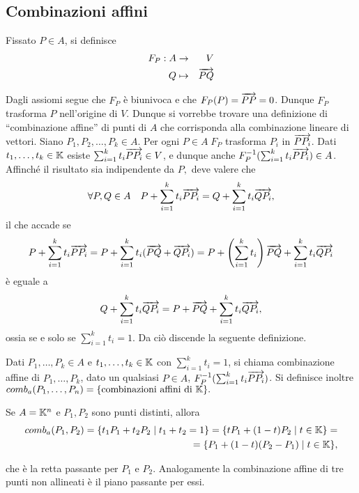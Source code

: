 	\subsection{Combinazioni affini}
 
 Fissato $P\in A$, si definisce
 \begin{eqnarray*}
  F_P: A & \to & V \\
  Q & \mapsto & \overrightarrow{PQ}
 \end{eqnarray*}
 
 Dagli assiomi segue che $F_P$ è biunivoca e che $F_P(P)=\overrightarrow{PP}=0$. Dunque $F_P$ trasforma
 $P$ nell'origine di $V$.
 Dunque si vorrebbe trovare una definizione di ``combinazione affine'' di punti di $A$ che corrisponda alla combinazione
 lineare di vettori. Siano $P_1,P_2,\ldots,P_k\in A$. Per ogni $P\in A\; F_P$ trasforma
 $P_i$ in $\overrightarrow{PP_i}$.
 Dati $t_1,\ldots,t_k\in \mathbb K$ esiste $\sum_{i=1}^kt_i\overrightarrow{PP_i}\in V$, e dunque anche
 $F_P^{-1}(\sum_{i=1}^kt_i\overrightarrow{PP_i})\in A$.
 Affinché il risultato sia indipendente da $P,$ deve valere che
 $$\forall P,Q\in A\quad P+\sum_{i=1}^kt_i\overrightarrow{PP_i}=Q+\sum_{i=1}^kt_i\overrightarrow{QP_i},$$
 il che accade se
 $$P+\sum_{i=1}^kt_i\overrightarrow{PP_i}=P+\sum_{i=1}^kt_i(\overrightarrow{PQ}+\overrightarrow{QP_i})=P+\left(\sum_{i=1}^kt_i\right)\overrightarrow{PQ}+\sum_{i=1}^kt_i\overrightarrow{QP_i}$$
 è eguale a
 $$Q+\sum_{i=1}^kt_i\overrightarrow{QP_i}=P+\overrightarrow{PQ}+\sum_{i=1}^kt_i\overrightarrow{QP_i},$$
 ossia se e solo se $\sum_{i=1}^kt_i=1$.
 Da ciò discende la seguente definizione.
 
 \begin{definition}
 Dati $P_1,\ldots,P_k\in A$ e $t_1,\ldots,t_k\in \mathbb K$ con $\sum_{i=1}^kt_i=1$,
 si chiama combinazione affine di $P_1,\ldots,P_k$, dato un qualsiasi $P\in A$, 
 $F_P^{-1}(\sum_{i=1}^kt_i\overrightarrow{PP_i})$.
 Si definisce inoltre $comb_a(P_1,\ldots,P_n)=\{\text{combinazioni affini di }\mathbb K\}.$
 \end{definition}
 
 \begin{example}
 Se $A=\mathbb K^n$ e $P_1,P_2$ sono punti distinti, allora
 \begin{eqnarray*}
	comb_a(P_1,P_2)=\{t_1P_1+t_2P_2\;|\;t_1+t_2=1\}=\{tP_1+(1-t)P_2\;|\; t\in \mathbb K\}=\\
	=\{P_1+(1-t)(P_2-P_1)\;|\; t\in \mathbb K\},
 \end{eqnarray*}
 \end{example}

 che è la retta passante per $P_1$ e $P_2.$ Analogamente la combinazione affine di tre punti non allineati
 è il piano passante per essi.
 
